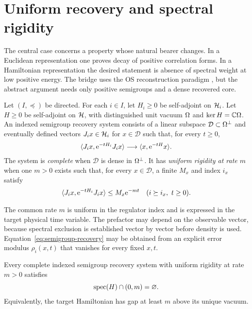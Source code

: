 \section{Uniform recovery and spectral rigidity}
\label{sec:recovery}

The central case concerns a property whose natural bearer changes.  In a
Euclidean representation one proves decay of positive correlation forms.  In
a Hamiltonian representation the desired statement is absence of spectral
weight at low positive energy.  The bridge uses the OS reconstruction
paradigm \cite{OsterwalderSchrader1973,OsterwalderSchrader1975}, but the
abstract argument needs only positive semigroups and a dense recovered core.

\begin{definition}
\label{def:recovery}
Let $(I,\preceq)$ be directed.  For each $i\in I$, let $H_i\geq0$ be
self-adjoint on $\mathcal H_i$.  Let $H\geq0$ be self-adjoint on $\mathcal H$, with
distinguished unit vacuum $\Omega$ and $\ker H=\mathbb C\Omega$.  An indexed
semigroup recovery system consists of a linear subspace
$\mathcal D\subset\Omega^\perp$ and eventually defined vectors
$J_i x\in\mathcal H_i$ for $x\in\mathcal D$ such that, for every $t\geq0$,
\begin{equation}
\label{eq:semigroup-recovery}
 \langle J_i x,\mathrm e^{-tH_i}J_i x\rangle
 \longrightarrow
 \langle x,\mathrm e^{-tH}x\rangle.
\end{equation}
The system is \emph{complete} when $\mathcal D$ is dense in $\Omega^\perp$.
It has \emph{uniform rigidity at rate $m$} when one $m>0$ exists such that,
for every $x\in\mathcal D$, a finite $M_x$ and index $i_x$ satisfy
\begin{equation}
\label{eq:uniform-rigidity}
 \langle J_i x,\mathrm e^{-tH_i}J_i x\rangle
 \leq M_x\mathrm e^{-mt}
 \quad (i\succeq i_x,\ t\geq0).
\end{equation}
\end{definition}

The common rate $m$ is uniform in the regulator index and is expressed in the
target physical time variable.  The prefactor may depend on the observable
vector, because spectral exclusion is established vector by vector before
density is used.  Equation~\eqref{eq:semigroup-recovery} may be obtained from
an explicit error modulus $\rho_i(x,t)$ that vanishes for every fixed $x,t$.

\begin{theorem}
\label{thm:recovery-spectrum}
Every complete indexed semigroup recovery system with uniform rigidity at
rate $m>0$ satisfies
\[
  \operatorname{spec}(H)\cap(0,m)=\varnothing.
\]
Equivalently, the target Hamiltonian has gap at least $m$ above its unique
vacuum.
\end{theorem}


